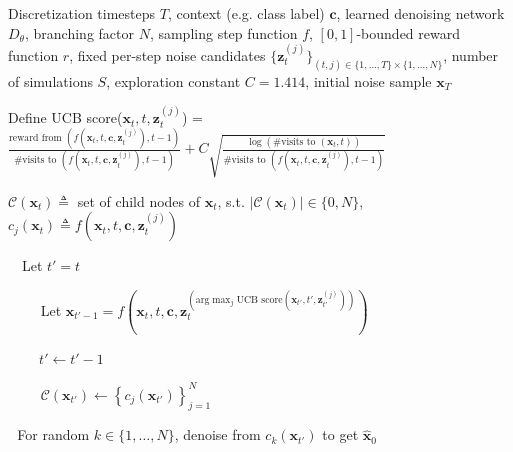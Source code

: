 \documentclass{article}
\newcommand{\x}{\mathbf{x}}
\begin{document}
\begin{algorithm}
\caption{MCTS noise search}
\label{alg:mcts}
\begin{algorithmic}[1]
\Require Discretization timesteps $T$, 
         context (e.g. class label) $\mathbf{c}$,
         learned denoising network $D_\theta$,
         branching factor $N$, sampling step function $f$, $[0,1]$-bounded reward function $r$, fixed per-step noise candidates $\{\mathbf{z}_t^{(j)}\}_{(t,j) \in \{1,\dots,T\}\times\{1, \dots, N\}}$, number of simulations $S$, exploration constant $C = 1.414$, initial noise sample $\x_T$

\vspace{2mm}
Define UCB score($\x_t, t, \mathbf{z}_t^{(j)}$) = $\frac{\text{reward from }(f(\x_t,t,\mathbf{c},\mathbf{z}_t^{(j)}),t-1)}{\text{\# visits to }(f(\x_t,t,\mathbf{c},\mathbf{z}_t^{(j)}),t-1)} + C\sqrt{\frac{\log\left(\text{\# visits to }(\x_t,t)\right)}{\text{\# visits to }(f(\x_t,t,\mathbf{c},\mathbf{z}_t^{(j)}),t-1)}}$

$\mathcal{C}(\x_t) \triangleq$ set of child nodes of $\x_t$, s.t. $|\mathcal{C}(\x_t)| \in \{0, N\}$, $c_j(\x_t) \triangleq f(\x_t,t,\mathbf{c},\mathbf{z}_t^{(j)})$
\vspace{4mm}


    
        $\:\:\:$ Let $t' = t$
        
        \While{$|\mathcal{C}(\x_{t'})| \neq 0$} \text{$\qquad\:\:\:\:\qquad\qquad\qquad\qquad\:\qquad\qquad\qquad\qquad\qquad$\textcolor{gray}{// selection}}
            
            $\qquad$ Let $\x_{t'-1} = f\left(\x_t,t,\mathbf{c},\mathbf{z}_t^{(\text{arg}\max_j \text{UCB score}(\x_{t'},t',\mathbf{z}_{t'}^{(j)}))}\right)$

            $\qquad\: t' \leftarrow t' - 1$

        \EndWhile

         \text{$\qquad\:\:\:\:\qquad\qquad\qquad\qquad\qquad\qquad\quad\:\:\qquad\qquad\qquad\qquad$\textcolor{gray}{// expansion}}

            $\qquad$ $\mathcal{C}(\x_{t'}) \leftarrow \left\{c_j(\x_{t'})\right\}_{j=1}^N$

        \EndIf

        $\:\:\:$For random  $k \in \{1, \dots, N\}$, denoise from $c_k(\x_{t'})$ to get $\hat{\x}_0$ $\qquad \qquad$ $\qquad$ \text{\textcolor{gray}{// simulation}}


\end{algorithmic}
\end{algorithm}
\end{document}
